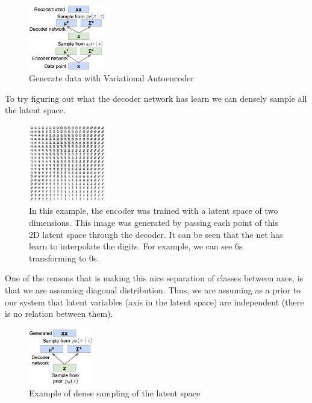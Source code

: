 \begin{figure}[!htb]
  \centering
  \includegraphics[width=0.3\textwidth]{Images/autoencoders/4.png}
  \caption{Generate data with Variational Autoencoder}
\end{figure}

To try figuring out what the decoder network has learn we can densely sample all the latent space.

\begin{figure}[!htb]
  \centering
  \includegraphics[width=0.3\textwidth]{Images/autoencoders/6.png}
  \caption{In this example, the encoder was trained with a latent space of two dimensions. This image was generated by passing each point of this 2D latent space through the decoder. It can be seen that the net has learn to interpolate the digits. For example, we can see 6s transforming to 0s.}
\end{figure}


One of the reasons that is making this nice separation of classes between axes, is that we are assuming diagonal distribution. Thus, we are assuming as a prior to our system that latent variables (axis in the latent space) are independent (there is no relation between them).

\begin{figure}[!htb]
  \centering
  \includegraphics[width=0.25\textwidth]{Images/autoencoders/5.png}
  \caption{Example of dense sampling of the latent space}
\end{figure}

